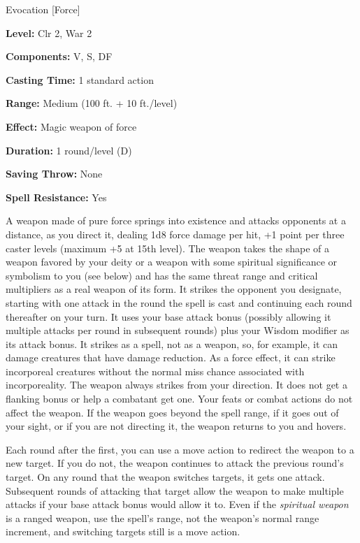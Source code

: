 
Evocation [Force]

\textbf{Level:} Clr 2, War 2

\textbf{Components:} V, S, DF

\textbf{Casting Time:} 1 standard action

\textbf{Range:} Medium (100 ft. + 10 ft./level)

\textbf{Effect:} Magic weapon of force

\textbf{Duration:} 1 round/level (D)

\textbf{Saving Throw:} None

\textbf{Spell Resistance:} Yes

A weapon made of pure force springs into existence and attacks opponents at a distance, 
as you direct it, dealing 1d8 force damage per hit, +1 point per three caster levels 
(maximum +5 at 15th level). The weapon takes the shape of a weapon favored by your 
deity or a weapon with some spiritual significance or symbolism to you (see below) 
and has the same threat range and critical multipliers as a real weapon of its 
form. It strikes the opponent you designate, starting with one attack in the round 
the spell is cast and continuing each round thereafter on your turn. It uses your 
base attack bonus (possibly allowing it multiple attacks per round in subsequent 
rounds) plus your Wisdom modifier as its attack bonus. It strikes as a spell, not 
as a weapon, so, for example, it can damage creatures that have damage reduction. 
As a force effect, it can strike incorporeal creatures without the normal miss 
chance associated with incorporeality. The weapon always strikes from your direction. 
It does not get a flanking bonus or help a combatant get one. Your feats or combat 
actions do not affect the weapon. If the weapon goes beyond the spell range, if 
it goes out of your sight, or if you are not directing it, the weapon returns to 
you and hovers.

Each round after the first, you can use a move action to redirect the weapon to 
a new target. If you do not, the weapon continues to attack the previous round's 
target. On any round that the weapon switches targets, it gets one attack. Subsequent 
rounds of attacking that target allow the weapon to make multiple attacks if your 
base attack bonus would allow it to. Even if the \textit{spiritual weapon} is a 
ranged weapon, use the spell's range, not the weapon's normal range increment, 
and switching targets still is a move action.

